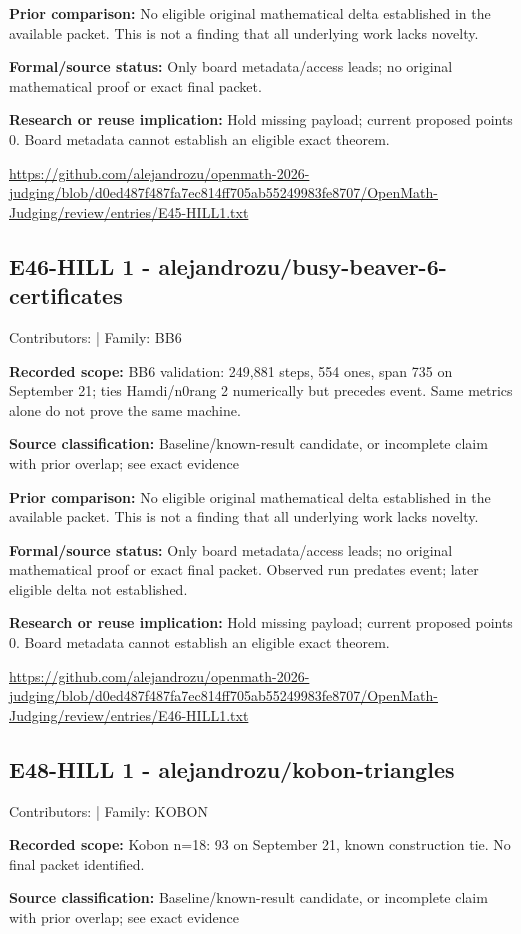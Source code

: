 \documentclass[11pt,a4paper]{article}
\begin{document}
\textbf{Prior comparison:} No eligible original mathematical delta established in the available packet. This is not a finding that all underlying work lacks novelty.

\textbf{Formal/source status:} Only board metadata/access leads; no original mathematical proof or exact final packet. 

\textbf{Research or reuse implication:} Hold missing payload; current proposed points 0. Board metadata cannot establish an eligible exact theorem.

{\small \url{https://github.com/alejandrozu/openmath-2026-judging/blob/d0ed487f487fa7ec814ff705ab55249983fe8707/OpenMath-Judging/review/entries/E45-HILL1.txt}\par}

\begin{samepage}
\subsection{E46-HILL 1  -  alejandrozu/busy-beaver-6-certificates}
{\small Contributors:  | Family: BB6\par}

\textbf{Recorded scope:} BB6 validation: 249,881 steps, 554 ones, span 735 on September 21; ties Hamdi/n0rang 2 numerically but precedes event. Same metrics alone do not prove the same machine.

\end{samepage}
\textbf{Source classification:} Baseline/known-result candidate, or incomplete claim with prior overlap; see exact evidence

\textbf{Prior comparison:} No eligible original mathematical delta established in the available packet. This is not a finding that all underlying work lacks novelty.

\textbf{Formal/source status:} Only board metadata/access leads; no original mathematical proof or exact final packet. Observed run predates event; later eligible delta not established.

\textbf{Research or reuse implication:} Hold missing payload; current proposed points 0. Board metadata cannot establish an eligible exact theorem.

{\small \url{https://github.com/alejandrozu/openmath-2026-judging/blob/d0ed487f487fa7ec814ff705ab55249983fe8707/OpenMath-Judging/review/entries/E46-HILL1.txt}\par}

\begin{samepage}
\subsection{E48-HILL 1  -  alejandrozu/kobon-triangles}
{\small Contributors:  | Family: KOBON\par}

\textbf{Recorded scope:} Kobon n=18: 93 on September 21, known construction tie. No final packet identified.

\end{samepage}
\textbf{Source classification:} Baseline/known-result candidate, or incomplete claim with prior overlap; see exact evidence
\end{document}
